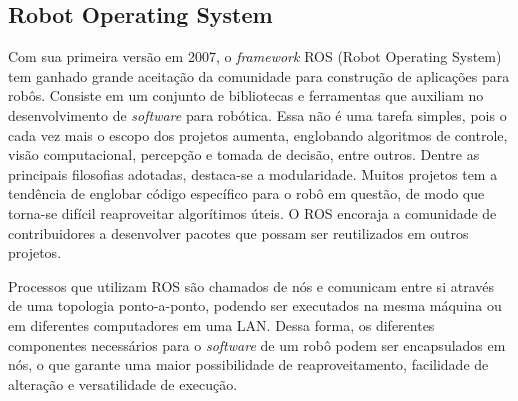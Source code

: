 \subsection{Robot Operating System}
Com sua primeira versão em 2007, o \textit{framework} ROS (Robot Operating System) tem ganhado grande aceitação da comunidade para construção de aplicações para robôs. Consiste em um conjunto de bibliotecas e ferramentas que auxiliam no desenvolvimento de \textit{software} para robótica. Essa não é uma tarefa simples, pois o cada vez mais o escopo dos projetos aumenta, englobando algoritmos de controle, visão computacional, percepção e tomada de decisão, entre outros.
Dentre as principais filosofias adotadas, destaca-se a modularidade. 
Muitos projetos tem a tendência de englobar código específico para o robô em questão, de modo que torna-se difícil reaproveitar algorítimos úteis. O ROS encoraja a comunidade de contribuidores a desenvolver pacotes que possam ser reutilizados em outros projetos.  

Processos que utilizam ROS são chamados de nós e comunicam entre si através de uma topologia ponto-a-ponto, podendo ser executados na mesma máquina ou em diferentes computadores em uma LAN. Dessa forma, os diferentes componentes necessários para o \textit{software} de um robô podem ser encapsulados em nós, o que garante uma maior possibilidade de reaproveitamento, facilidade de alteração e versatilidade de execução.


